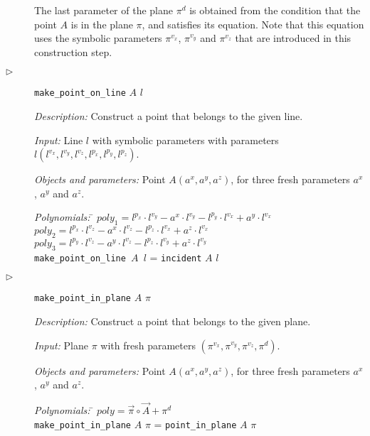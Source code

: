 \documentclass[final,1p,times,authoryear]{elsarticle}
\begin{document}
\begin{description}
The last parameter of the plane $\pi^{d}$ is obtained from the
condition that the point $A$ is in the plane $\pi$, and satisfies its
equation. Note that this equation uses the symbolic parameters
$\pi^{v_x}$, $\pi^{v_y}$ and $\pi^{v_z}$ that are introduced in this
construction step.

\item[$\triangleright$] {\tt make\_point\_on\_line} $A$ $l$

  {\em Description:} Construct a point that belongs to the given line.
  
  {\em Input:} Line $l$ with symbolic parameters with parameters
  $l(l^{v_x}, l^{v_y}, l^{v_z}, l^{p_x}, l^{p_y}, l^{p_z})$.

  {\em Objects and parameters:} Point $A(a^x, a^y, a^z)$, for three
  fresh parameters $a^x$, $a^y$ and $a^z$.

\begin{tabbing}
{\em Polynomials:} \= $poly_1 = l^{p_x}\cdot l^{v_y} - a^x\cdot l^{v_y} - l^{p_y}\cdot l^{v_x} + a^y\cdot l^{v_x}$ \\
                   \> $poly_2 = l^{p_x}\cdot l^{v_z} - a^x\cdot l^{v_z} - l^{p_z}\cdot l^{v_x} + a^z\cdot l^{v_x}$ \\
                   \> $poly_3 = l^{p_y}\cdot l^{v_z} - a^y\cdot l^{v_z} - l^{p_z}\cdot l^{v_y} + a^z\cdot l^{v_y}$ \\
                   \> {\tt make\_point\_on\_line $A$ $l$} = {\tt incident} $A$ $l$
\end{tabbing}

\item[$\triangleright$] {\tt make\_point\_in\_plane} $A$ $\pi$ 

  {\em Description:} Construct a point that belongs to the given
  plane.
  
  {\em Input:} Plane $\pi$ with fresh parameters $(\pi^{v_x},
  \pi^{v_y}, \pi^{v_z}, \pi^{d})$.

  {\em Objects and parameters:} Point $A(a^x, a^y, a^z)$, for three
  fresh parameters $a^x$, $a^y$ and $a^z$.

\begin{tabbing}
{\em Polynomials:} \= $poly = \overrightarrow{\pi} \circ \overrightarrow{A} + \pi^{d}$ \\
                   \> {\tt make\_point\_in\_plane} $A$ $\pi$  = {\tt point\_in\_plane} $A$ $\pi$

\end{tabbing}


\end{description}
\end{document}
